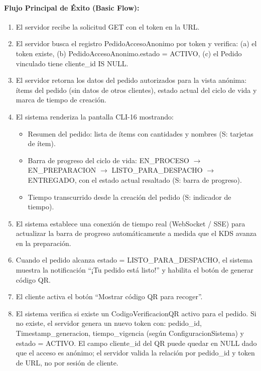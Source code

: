 \paragraph{Flujo Principal de Éxito (Basic Flow):}
\begin{enumerate}
    \item[I.] El servidor recibe la solicitud GET con el token en la URL.
    \item[II.] El servidor busca el registro PedidoAccesoAnonimo por token y verifica: (a) el token existe, (b) PedidoAccesoAnonimo.estado = ACTIVO, (c) el Pedido vinculado tiene cliente\_id IS NULL.
    \item[III.] El servidor retorna los datos del pedido autorizados para la vista anónima: ítems del pedido (sin datos de otros clientes), estado actual del ciclo de vida y marca de tiempo de creación.
    \item[IV.] El sistema renderiza la pantalla CLI-16 mostrando:
    \begin{itemize}
        \item Resumen del pedido: lista de ítems con cantidades y nombres (S: tarjetas de ítem).
        \item Barra de progreso del ciclo de vida: EN\_PROCESO $\rightarrow$ EN\_PREPARACION $\rightarrow$ LISTO\_PARA\_DESPACHO $\rightarrow$ ENTREGADO, con el estado actual resaltado (S: barra de progreso).
        \item Tiempo transcurrido desde la creación del pedido (S: indicador de tiempo).
    \end{itemize}
    \item[V.] El sistema establece una conexión de tiempo real (WebSocket / SSE) para actualizar la barra de progreso automáticamente a medida que el KDS avanza en la preparación.
    \item[VI.] Cuando el pedido alcanza estado = LISTO\_PARA\_DESPACHO, el sistema muestra la notificación ``¡Tu pedido está listo!'' y habilita el botón de generar código QR.
    \item[VII.] El cliente activa el botón ``Mostrar código QR para recoger''.
    \item[VIII.] El sistema verifica si existe un CodigoVerificacionQR activo para el pedido. Si no existe, el servidor genera un nuevo token con: pedido\_id, Timestamp\_generacion, tiempo\_vigencia (según ConfiguracionSistema) y estado = ACTIVO. El campo cliente\_id del QR puede quedar en NULL dado que el acceso es anónimo; el servidor valida la relación por pedido\_id y token de URL, no por sesión de cliente.

\end{enumerate}
